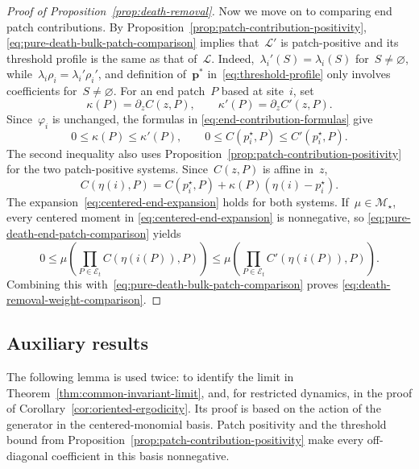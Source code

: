 \documentclass[EJP,preprint,NODS,nobera]{ejpecp}
\newcommand{\bb}[1]{\left(#1\right)}
\newcommand{\vn}{\varnothing}
\newcommand{\mb}[1]{\mathbf{#1}}
\newcommand{\Lcal}{\mathcal{L}}
\newcommand{\chg}[1]{{\color{changegreen}#1}}
\begin{document}
\begin{proof}[Proof of Proposition~\ref{prop:death-removal}]
Now we move on to comparing end patch contributions. By Proposition~\ref{prop:patch-contribution-positivity},
\eqref{eq:pure-death-bulk-patch-comparison} implies that~$\Lcal'$ is
patch-positive and its threshold profile is the same as that of~$\Lcal$. Indeed,~$\lambda_i'(S) = \lambda_i(S)$ for~$S\neq \vn$, while~$\lambda_i\rho_i=\lambda_i'\rho_i'$,
and definition of~$\mb p^*$ in~\eqref{eq:threshold-profile} only involves coefficients for~$S\neq \vn$. For an end patch~$P$ based at
site~$i$, set
\begin{equation*}
\kappa(P)=\partial_zC(z,P),
\qquad
\kappa'(P)=\partial_zC'(z,P).
\end{equation*}
Since~$\varphi_i$ is unchanged, the formulas in
\eqref{eq:end-contribution-formulas} give
\begin{equation}
\label{eq:pure-death-end-patch-comparison}
0\leq\kappa(P)\leq\kappa'(P),
\qquad
0\leq C\bb{p_i^\star,P}
\leq
C'\bb{p_i^\star,P}.
\end{equation}
The second inequality also uses Proposition~\ref{prop:patch-contribution-positivity}
for the two patch-positive systems. Since~$C(z,P)$ is affine in~$z$,
\begin{equation*}
C\bb{\eta(i),P}
=
C\bb{p_i^\star,P}
+
\kappa(P)\bb{\eta(i)-p_i^\star}.
\end{equation*}
\chg{The expansion~\eqref{eq:centered-end-expansion} holds for both systems.}
If~$\mu\in\mathcal M_\star$, every centered moment in
\chg{\eqref{eq:centered-end-expansion}} is nonnegative, so
\eqref{eq:pure-death-end-patch-comparison} yields
\begin{equation*}
0
\leq
\mu\bb{
\prod_{P\in\mathcal E_t}
C\bb{\eta\bb{i(P)},P}
}
\leq
\mu\bb{
\prod_{P\in\mathcal E_t}
C'\bb{\eta\bb{i(P)},P}
}.
\end{equation*}
Combining this with~\eqref{eq:pure-death-bulk-patch-comparison} proves
\eqref{eq:death-removal-weight-comparison}.
\end{proof}

\subsection{Auxiliary results}
\label{subsec:auxiliary}

The following lemma is used twice: to identify the limit in
Theorem~\ref{thm:common-invariant-limit}, and, for restricted dynamics, in
the proof of Corollary~\ref{cor:oriented-ergodicity}. Its proof is based on
the action of the generator in the centered-monomial basis. Patch positivity
and the threshold bound from Proposition~\ref{prop:patch-contribution-positivity}
make every off-diagonal coefficient in this basis nonnegative.
\end{document}
